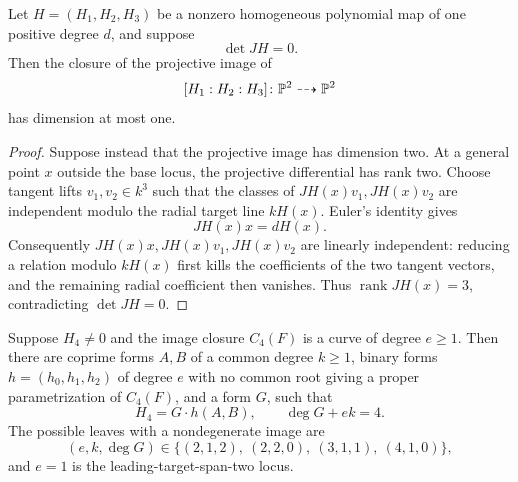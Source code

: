 \documentclass[11pt,reqno]{amsart}
\begin{document}
\begin{lemma}
\label{lem:leading-image-dimension}
Let \(H=(H_1,H_2,H_3)\) be a nonzero homogeneous polynomial map of one
positive degree \(d\), and suppose
\[
\det JH=0.
\]
Then the closure of the projective image of
\[
[H_1:H_2:H_3]\colon\mathbb P^2\dashrightarrow\mathbb P^2
\]
has dimension at most one.
\end{lemma}

\begin{proof}
Suppose instead that the projective image has dimension two.  At a general
point \(x\) outside the base locus, the projective differential has rank two.
Choose tangent lifts \(v_1,v_2\in k^3\) such that the classes of
\(JH(x)v_1,JH(x)v_2\) are independent modulo the radial target line
\(kH(x)\).  Euler's identity gives
\[
JH(x)x=dH(x).
\]
Consequently \(JH(x)x,JH(x)v_1,JH(x)v_2\) are linearly independent: reducing
a relation modulo \(kH(x)\) first kills the coefficients of the two tangent
vectors, and the remaining radial coefficient then vanishes.  Thus
\(\operatorname{rank}JH(x)=3\), contradicting \(\det JH=0\).
\end{proof}

\begin{lemma}
\label{lem:leading-image}
Suppose \(H_4\ne0\) and the image closure \(C_4(F)\) is a curve of
degree \(e\ge1\).  Then there are coprime forms \(A,B\) of a common
degree \(k\ge1\), binary forms \(h=(h_0,h_1,h_2)\) of degree \(e\)
with no common root giving a proper parametrization of \(C_4(F)\), and a
form \(G\), such that
\[
H_4=G\cdot h(A,B),\qquad \deg G+ek=4.
\]
The possible leaves with a nondegenerate image are
\[
(e,k,\deg G)\in\{(2,1,2),\ (2,2,0),\ (3,1,1),\ (4,1,0)\},
\]
and \(e=1\) is the leading-target-span-two locus.
\end{lemma}
\end{document}
